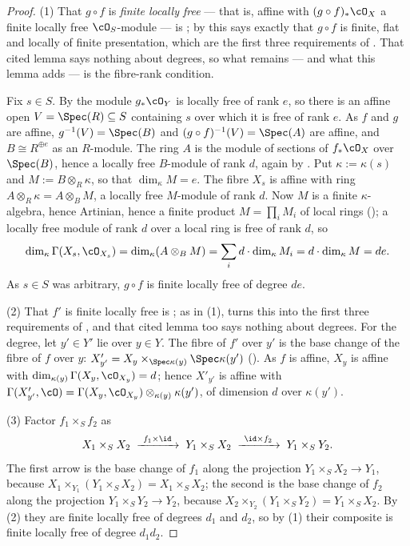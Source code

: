 \begin{proof}
(1)  That $g\circ f$ is \emph{finite locally free} --- that is, affine
with $(g\circ f)_*\cO_X$ a finite locally free $\cO_S$-module --- is
; by
 this says exactly that
$g\circ f$ is finite, flat and locally of finite presentation, which are
the first three requirements of .  That
cited lemma says nothing about degrees, so what remains --- and what this
lemma adds --- is the fibre-rank condition.

Fix $s\in S$.  By  the module $g_*\cO_Y$ is
locally free of rank $e$, so there is an affine open
$V=\Spec(R)\subseteq S$ containing $s$ over which it is free of rank
$e$.  As $f$ and $g$ are affine, $g^{-1}(V)=\Spec(B)$ and
$(g\circ f)^{-1}(V)=\Spec(A)$ are affine, and $B\cong R^{\oplus e}$ as an
$R$-module.  The ring $A$ is the module of sections of $f_*\cO_X$ over
$\Spec(B)$, hence a locally free $B$-module of rank $d$, again by
.  Put $\kappa:=\kappa(s)$ and
$M:=B\otimes_R\kappa$, so that $\dim_\kappa M=e$.  The fibre $X_s$ is
affine with ring $A\otimes_R\kappa=A\otimes_BM$, a locally free
$M$-module of rank $d$.  Now $M$ is a finite $\kappa$-algebra, hence
Artinian, hence a finite product $M=\prod_iM_i$ of local rings
(); a locally free module of rank
$d$ over a local ring is free of rank $d$, so
\[
\dim_\kappa\Gamma(X_s,\cO_{X_s})=\dim_\kappa(A\otimes_BM)
=\sum_i d\cdot\dim_\kappa M_i=d\cdot\dim_\kappa M=de .
\]
As $s\in S$ was arbitrary, $g\circ f$ is finite locally free of degree
$de$.

(2)  That $f'$ is finite locally free is
; as in (1),
 turns this into the first
three requirements of , and that cited
lemma too says nothing about degrees.  For the degree, let $y'\in Y'$ lie
over $y\in Y$.  The fibre of $f'$ over $y'$ is the base change of the fibre of
$f$ over $y$:
$X'_{y'}=X_y\times_{\Spec\kappa(y)}\Spec\kappa(y')$
().  As $f$ is affine, $X_y$ is affine with
$\dim_{\kappa(y)}\Gamma(X_y,\cO_{X_y})=d$; hence $X'_{y'}$ is affine with
$\Gamma(X'_{y'},\cO)=\Gamma(X_y,\cO_{X_y})\otimes_{\kappa(y)}\kappa(y')$,
of dimension $d$ over $\kappa(y')$.

(3)  Factor $f_1\times_Sf_2$ as
\[
X_1\times_SX_2\;\xrightarrow{\ f_1\times\id\ }\;Y_1\times_SX_2
\;\xrightarrow{\ \id\times f_2\ }\;Y_1\times_SY_2 .
\]
The first arrow is the base change of $f_1$ along the projection
$Y_1\times_SX_2\to Y_1$, because
$X_1\times_{Y_1}(Y_1\times_SX_2)=X_1\times_SX_2$; the second is the base
change of $f_2$ along the projection $Y_1\times_SY_2\to Y_2$, because
$X_2\times_{Y_2}(Y_1\times_SY_2)=Y_1\times_SX_2$.  By (2) they are finite
locally free of degrees $d_1$ and $d_2$, so by (1) their composite is
finite locally free of degree $d_1d_2$.
\end{proof}

